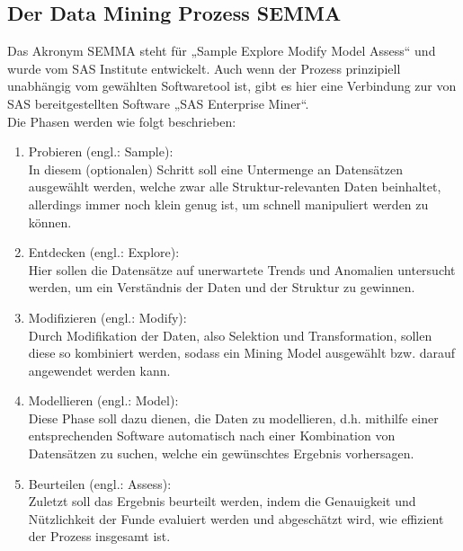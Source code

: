 \subsection{Der Data Mining Prozess SEMMA}
\label{sec:process:alt:semma}

Das Akronym SEMMA steht für „Sample Explore Modify Model Assess“ und wurde vom
SAS Institute entwickelt. Auch wenn der Prozess prinzipiell unabhängig vom
gewählten Softwaretool ist, gibt es hier eine Verbindung zur von SAS
bereitgestellten Software „SAS Enterprise Miner“. \\
Die Phasen werden wie folgt beschrieben:
\begin{enumerate}
  \item Probieren (engl.: Sample):  \\
  In diesem (optionalen) Schritt soll eine Untermenge an Datensätzen ausgewählt
  werden, welche zwar alle Struktur-relevanten Daten beinhaltet, allerdings immer
  noch klein genug ist, um schnell manipuliert werden zu können.
  \item Entdecken (engl.: Explore): \\
  Hier sollen die Datensätze auf unerwartete Trends und Anomalien untersucht
  werden, um ein Verständnis der Daten und der Struktur zu gewinnen.
  \item Modifizieren (engl.: Modify):  \\
  Durch Modifikation der Daten, also Selektion und Transformation, sollen diese
  so kombiniert werden, sodass ein Mining Model ausgewählt bzw. darauf
  angewendet werden kann.
  \item Modellieren (engl.: Model):  \\
  Diese Phase soll dazu dienen, die Daten zu modellieren, d.h. mithilfe einer
  entsprechenden Software automatisch nach einer Kombination von Datensätzen zu
  suchen, welche ein gewünschtes Ergebnis vorhersagen.
  \item Beurteilen (engl.: Assess):  \\
  Zuletzt soll das Ergebnis beurteilt werden, indem die Genauigkeit und
  Nützlichkeit der Funde evaluiert werden und abgeschätzt wird, wie effizient der
  Prozess insgesamt ist.
\end{enumerate}
